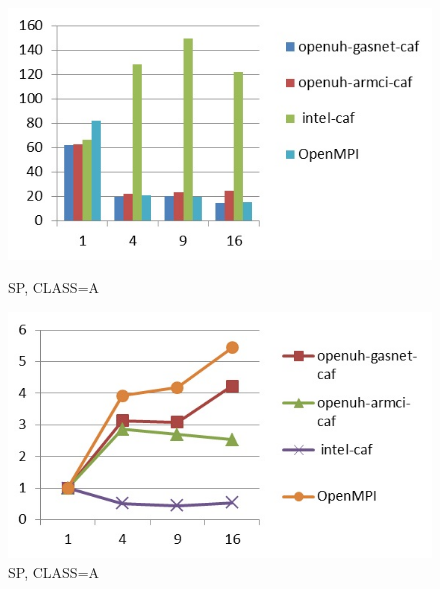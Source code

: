 \begin{figure}[ht]
\begin{minipage}[b]{0.45\linewidth}
\centering
\includegraphics[width=\textwidth]{./figures/sp_A_time.jpg}
\caption{SP, CLASS=A}
\label{fig:figure1}
\end{minipage}
\hspace{0.5cm}
\begin{minipage}[b]{0.45\linewidth}
\centering
\includegraphics[width=\textwidth]{./figures/sp_A_scalability.jpg}
\caption{SP, CLASS=A}
\label{fig:figure2}
\end{minipage}
\end{figure}



